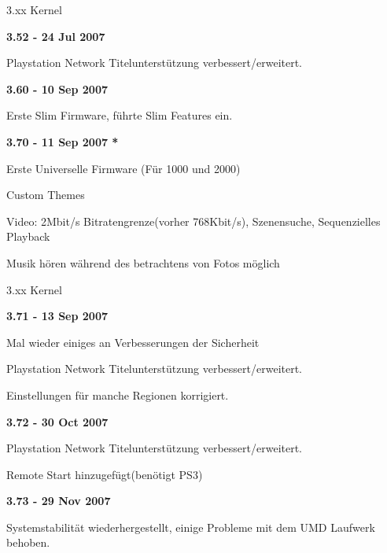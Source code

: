\documentclass[mode=print,paper=screen,size=10pt,style=paintings]{powerdot}
\newcommand{\Anf}[1]{\glqq #1\grqq}
\begin{document}
\begin{slide}{3.xx Kernel}
	\begin{large}\textbf{3.52 - 24 Jul 2007}\end{large}
	\begin{list}{-}{}
		\item{Playstation Network Titelunterstützung verbessert/erweitert.}
	\end{list}
	\begin{large}\textbf{3.60 - 10 Sep 2007}\end{large}
	\begin{list}{-}{}
		\item{Erste Slim Firmware, führte Slim Features ein.}
	\end{list}
	\begin{large}\textbf{3.70 - 11 Sep 2007 *}\end{large}
	\begin{list}{-}{}
		\item{Erste Universelle Firmware (Für 1000 und 2000)}
		\item{Custom Themes}
		\item{Video: 2Mbit/s Bitratengrenze(vorher 768Kbit/s), Szenensuche, Sequenzielles Playback}
		\item{Musik hören während des betrachtens von Fotos möglich} 
	\end{list}
\end{slide}

\begin{slide}{3.xx Kernel}
	\begin{large}\textbf{3.71 - 13 Sep 2007}\end{large}
	\begin{list}{-}{}
		\item{Mal wieder einiges an Verbesserungen der \Anf{Sicherheit}}
		\item{Playstation Network Titelunterstützung verbessert/erweitert.}
		\item{Einstellungen für manche Regionen korrigiert.}
	\end{list}
	\begin{large}\textbf{3.72 - 30 Oct 2007}\end{large}
	\begin{list}{-}{}
		\item{Playstation Network Titelunterstützung verbessert/erweitert.}
		\item{Remote Start hinzugefügt(benötigt PS3)}
	\end{list}
	\begin{large}\textbf{3.73 - 29 Nov 2007}\end{large}
	\begin{list}{-}{}
		\item{Systemstabilität wiederhergestellt, einige Probleme mit dem UMD Laufwerk behoben.}
	\end{list}
\end{slide}
\end{document}
